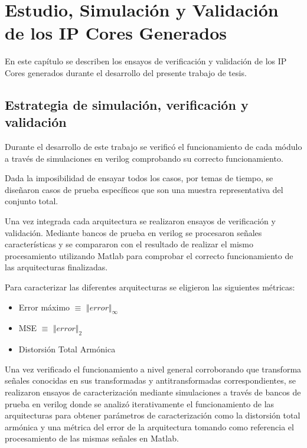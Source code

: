 \chapter{Estudio, Simulación y Validación de los IP Cores Generados} \label{sec:simsec}

En este capítulo se describen los ensayos de verificación y validación de los IP
Cores generados durante el desarrollo del presente trabajo de tesis. 

\section{Estrategia de simulación, verificación y validación}

Durante el desarrollo de este trabajo se verificó el funcionamiento de cada módulo a través de
simulaciones en verilog comprobando su correcto funcionamiento.

Dada la imposibilidad de ensayar todos los casos, por temas de tiempo, se diseñaron casos de prueba
específicos que son una muestra representativa del conjunto total.

Una vez integrada cada arquitectura se realizaron ensayos de verificación y validación. Mediante
bancos de prueba en verilog se procesaron señales características y se compararon con el resultado de
realizar el mismo procesamiento utilizando Matlab para comprobar el correcto funcionamiento de las
arquitecturas finalizadas. 

Para caracterizar las diferentes arquitecturas se eligieron las siguientes métricas:

\begin{itemize}
  \item Error máximo $\equiv$ $\Vert error \Vert_\infty$
  \item MSE $\equiv$ $\Vert error \Vert_2$
  \item Distorsión Total Armónica
\end{itemize} 

Una vez verificado el funcionamiento a nivel general corroborando que transforma señales conocidas
en sus transformadas y antitransformadas correspondientes, se realizaron ensayos de caracterización
mediante simulaciones a través de bancos de prueba en verilog donde se analizó iterativamente el
funcionamiento de las arquitecturas para obtener parámetros de caracterización como la distorsión
total armónica y una métrica del error de la arquitectura tomando como referencia el procesamiento
de las mismas señales en Matlab.

